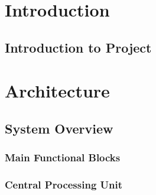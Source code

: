 \documentclass[a4paper,12pt]{book}
\begin{document}
\tableofcontents
\clearpage
\setcounter{page}{1}
\chapter{Introduction} 
\section{Introduction to Project}
\clearpage
\setcounter{page}{4}
\chapter{Architecture} 
\clearpage
\setcounter{page}{9}
\section{System Overview}
\clearpage
\setcounter{page}{12}
\subsection{Main Functional Blocks} 
\clearpage
\setcounter{page}{14}
\subsection{Central Processing Unit} 
\end{document}
